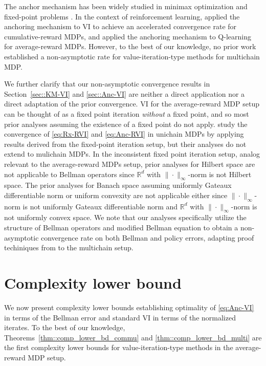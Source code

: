 \documentclass{article} %
\newcommand{\reals}{\mathbb{R}}
\begin{document}
The anchor mechanism has been widely studied in minimax optimization and fixed-point problems \citep{halpern1967fixed,sabach2017first, Lieder2021halpern, park2022exact, contreras2022optimal, yoon2021accelerated}. In the context of reinforcement learning, \citet{lee2024accelerating} applied the anchoring mechanism to VI to achieve an accelerated convergence rate for cumulative-reward MDPs, and  \citet{bravostochastic} applied the anchoring mechanism to Q-learning for average-reward MDPs. However, to the best of our knowledge, no prior work established a non-asymptotic rate for value-iteration-type methods for multichain MDP. 

We further clarify that our non-asymptotic convergence results in Section~\ref{sec::KM-VI} and \ref{sec::Anc-VI} are neither a direct application nor a direct adaptation of the prior convergence. VI for the average-reward MDP setup can be thought of as a fixed point iteration \emph{without} a fixed point, and so most prior analyses assuming the existence of a fixed point do not apply. \citet{bravostochastic, bravo2024stochastic} study the convergence of \ref{eq:Rx-RVI} and \ref{eq:Anc-RVI} in unichain MDPs by applying results derived from the fixed-point iteration setup, but their analyses do not extend to mulichain MDPs. In the inconsistent fixed point iteration setup, analog relevant to the average-reward MDPs setup, prior analyses for Hilbert space \citep{pazy1971asymptotic, applegate2024infeasibility, bauschke2014generalized, liu2019new, park2023} are not applicable to Bellman operators since $\reals^d$ with $\|\cdot\|_{\infty}$-norm is not Hilbert space. The prior analyses for Banach space assuming uniformly Gateaux differentiable norm  \citep{Browder1966TheSB, reich1973asymptotic, reich1987asymptotic} or uniform convexity \citep{Browder1966TheSB} are not applicable either since $\|\cdot\|_{\infty}$-norm is not uniformly Gateaux differentiable norm and $\reals^d$ with $\|\cdot\|_{\infty}$-norm is not uniformly convex space. 
We note that our analyses specifically utilize the structure of Bellman operators and modified Bellman equation to obtain a non-asymptotic convergence rate on both Bellman and policy errors, adapting proof techiniques from \citet{cominetti2014rate, contreras2022optimal} to the multichain setup.

\section{Complexity lower bound}\label{sec::comp_lower_bd}
We now present complexity lower bounds establishing optimality of \ref{eq:Anc-VI} in terms of the Bellman error and standard VI in terms of the normalized iterates. To the best of our knowledge, Theorems~\ref{thm::comp_lower_bd_commu} and \ref{thm::comp_lower_bd_multi} are the first complexity lower bounds for value-iteration-type methods in the average-reward MDP setup.
\end{document}

